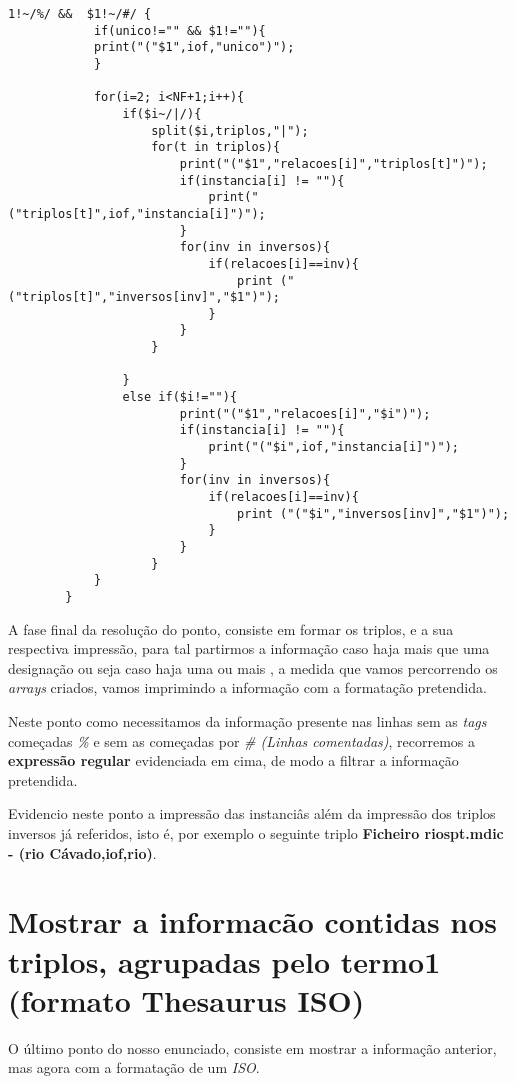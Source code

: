 \documentclass{report}
\def\titulo#1{\section{#1}}
\begin{document}
\begin{verbatim}
1!~/%/ &&  $1!~/#/ {    
            if(unico!="" && $1!=""){
            print("("$1",iof,"unico")");
            }

            for(i=2; i<NF+1;i++){
                if($i~/|/){
                    split($i,triplos,"|");
                    for(t in triplos){
                        print("("$1","relacoes[i]","triplos[t]")");
                        if(instancia[i] != ""){
                            print("("triplos[t]",iof,"instancia[i]")");
                        }
                        for(inv in inversos){
                            if(relacoes[i]==inv){
                                print ("("triplos[t]","inversos[inv]","$1")");
                            }
                        }
                    }

                }
                else if($i!=""){
                        print("("$1","relacoes[i]","$i")");
                        if(instancia[i] != ""){
                            print("("$i",iof,"instancia[i]")");
                        }
                        for(inv in inversos){
                            if(relacoes[i]==inv){
                                print ("("$i","inversos[inv]","$1")");
                            }
                        }
                    }
            }
        }
\end{verbatim}

    A fase final da resolução do ponto, consiste em formar os triplos, e a sua respectiva impressão, para tal partirmos a informação caso haja mais que uma designação ou seja caso haja uma ou mais \textbf{\textbar}, a medida que vamos percorrendo os \textit{arrays} criados, vamos imprimindo a informação com a formatação pretendida.
    
    Neste ponto como necessitamos da informação presente nas linhas sem as \textit{tags} começadas \textit{\%} e sem as começadas por \textit{\# (Linhas comentadas)}, recorremos a \textbf{expressão regular} evidenciada em cima, de modo a filtrar a informação pretendida. 

    Evidencio neste ponto a impressão das instanciâs além da impressão dos triplos inversos já referidos, isto é, por exemplo o seguinte triplo \textbf{Ficheiro riospt.mdic - (rio Cávado,iof,rio)}.


\titulo{ Mostrar a informacão contidas nos triplos, agrupadas pelo termo1 (formato Thesaurus ISO) }

    O último ponto do nosso enunciado, consiste em mostrar a informação anterior, mas agora com a formatação de um \textit{ISO}.
\end{document}
